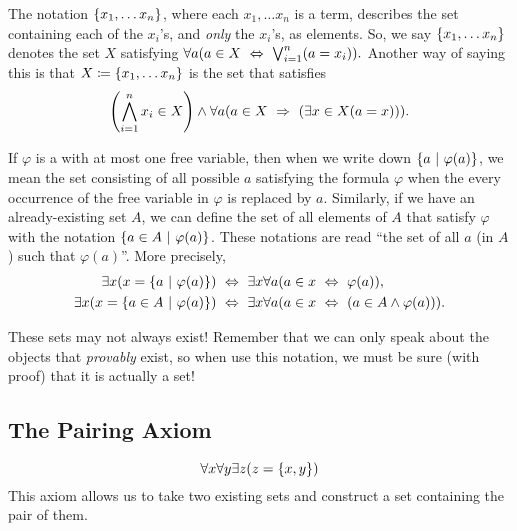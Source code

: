 \begin{definition}\label{not:setbuilder}
    The notation \(\set*{x_1, \dots x_n}\),
    where each \(x_1, \dots x_n\) is a term, 
    describes the set containing each of the \(x_i\)'s, and \emph{only} the \(x_i\)'s, as elements.
    So, we say \(\set*{x_1, \dots x_n}\) denotes the set \(X\) satisfying
    \(
        \forall a \pn*{a \in X \iff \bigjoin_{i = 1}^{n}\pn*{a = x_i}}.
    \)
    Another way of saying this is that \(X \defn \set*{x_1, \dots x_n}\) is the set that satisfies
    \[
        \pn*{\bigmeet_{i = 1}^{n}x_i \in X}
             \meet \forall a \pn*{a \in X \implies \pn*{\exists x \in X \pn*{a = x}}}.
    \]
\end{definition}

\begin{definition}
    If \(\varphi\) is a {\wff} with at most one free variable,
    then when we write down \(\set*{a \suchthat \varphi(a)}\),
    we mean the set consisting of all possible \(a\) satisfying the formula \(\varphi\)
    when the every occurrence of the free variable in \(\varphi\) is replaced by \(a\).
    Similarly, if we have an already-existing set \(A\),
    we can define the set of all elements of \(A\) that satisfy \(\varphi\)
    with the notation \(\set*{a \in A \suchthat \varphi(a)}\).
    These notations are read ``the set of all \(a\) (in \(A\)) such that \(\varphi(a)\)''.
    More precisely,
    \begin{align*}
        \exists x \pn*{x = \set*{a \suchthat \varphi(a)}}
            &\iff \exists x \forall a \pn*{a \in x \iff \varphi(a)},\\
        \exists x \pn*{x = \set*{a  \in A \suchthat \varphi(a)}}
            &\iff \exists x \forall a \pn*{a \in x \iff \pn*{a \in A \meet \varphi(a)}}.
    \end{align*}

    \begin{note}
        These sets may not always exist!
        Remember that we can only speak about the objects that \emph{provably} exist,
        so when use this notation,
        we must be sure (with proof) that it is actually a set!
    \end{note}
\end{definition}

\subsection{The Pairing Axiom}
\begin{axiom}[Pairing]\label{ax:pairing}
    \[\forall x \forall y \exists z \pn*{z = \set*{x, y}}\]
    This axiom allows us to take two existing sets and construct a set containing the pair of them.
\end{axiom}

